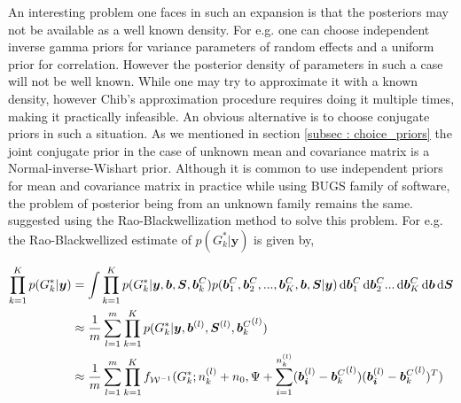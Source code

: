 An interesting problem one faces in such an expansion is that the posteriors may not be available as a well known density. For e.g. one can choose independent inverse gamma priors for variance parameters of random effects and a uniform prior for correlation. However the posterior density of parameters in such a case will not be well known. While one may try to approximate it with a known density, however Chib's approximation procedure requires doing it multiple times, making it practically infeasible. An obvious alternative is to choose conjugate priors in such a situation. As we mentioned in section \ref{subsec : choice_priors} the joint conjugate prior in the case of unknown mean and covariance matrix is a Normal-inverse-Wishart prior. Although it is common to use independent priors for mean and covariance matrix in practice while using BUGS family of software, the problem of posterior being from an unknown family remains the same. \citet{chib_marginal_1995} suggested using the Rao-Blackwellization method to solve this problem. For e.g. the Rao-Blackwellized estimate of $p(G_k^*|\boldsymbol{y})$ is given by,

\begin{equation}
\label{eq : rao_blackwellization_wishart}
\begin{split}
\prod_{k=1}^K p(G_k^*|\boldsymbol{y}) & = \int \prod_{k=1}^{K} p(G_k^*| \boldsymbol{y}, \boldsymbol{b}, \boldsymbol{S}, \boldsymbol{b}_k^C) p(\boldsymbol{b}_1^C, \boldsymbol{b}_2^C,..., \boldsymbol{b}_K^C,\boldsymbol{b}, \boldsymbol{S}|\boldsymbol{y}) 
\mathop{}\!\mathrm{d}{\boldsymbol{b}_1^C} \mathop{}\!\mathrm{d}{\boldsymbol{b}_2^C} ... \mathop{}\!\mathrm{d}{\boldsymbol{b}_K^C} \mathop{}\!\mathrm{d}{\boldsymbol{b}} \mathop{}\!\mathrm{d}{\boldsymbol{S}}\\
& \approx \frac 1 m \sum_{l=1}^m \prod_{k=1}^{K} p(G_k^*| \boldsymbol{y}, \boldsymbol{b}^{(l)}, \boldsymbol{S}^{(l)}, {\boldsymbol{b}_k^C}^{(l)
})\\
& \approx \frac 1 m \sum_{l=1}^m \prod_{k=1}^{K} f_{\mathcal{W}^{-1}}(G_k^*; n_k^{(l)}+n_0, \Psi + \sum_{i=1}^{n_k^{(l)}}(\boldsymbol{b_i}^{(l)} - {\boldsymbol{b}_k^C}^{(l)})(\boldsymbol{b_i}^{(l)} - {\boldsymbol{b}_k^C}^{(l)})^T)
\end{split}
\end{equation}

